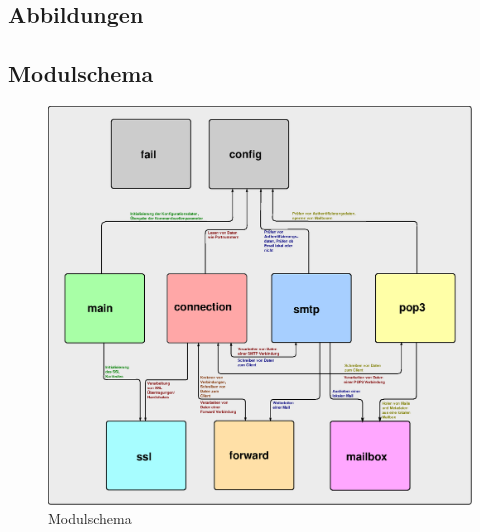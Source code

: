 \documentclass[final,a4paper,11pt,notitlepage,halfparskip]{scrreprt}
\begin{document}
\begin{appendix}
  \chapter{Abbildungen}
  \section{Modulschema}
  \begin{figure}[htb]
    \includegraphics[width=\textwidth]{schema.eps}
    \caption{Modulschema}
    \label{fig:schema}
  \end{figure}
\end{appendix}
\end{document}
